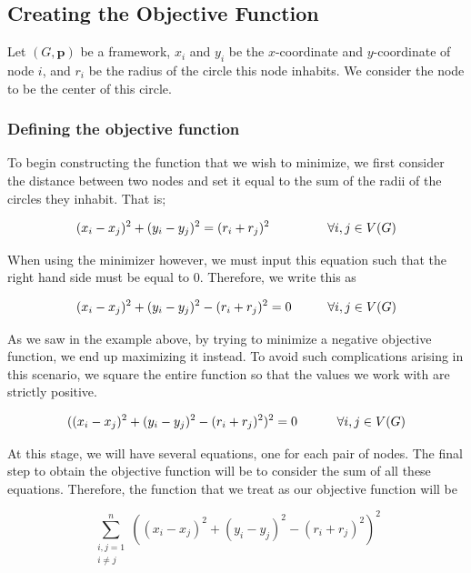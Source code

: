 \subsection{Creating the Objective Function}

\begin{flushleft}
Let $(G, \mathbf{p})$ be a framework, $x_i$ and $y_i$ be the $x$-coordinate and $y$-coordinate of node $i$, and $r_i$ be the radius of the circle this node inhabits. We consider the node to be the center of this circle.
\end{flushleft}

\subsubsection{Defining the objective function}

\begin{flushleft}
To begin constructing the function that we wish to minimize, we first consider the distance between two nodes and set it equal to the sum of the radii of the circles they inhabit. That is;

\begin{equation*}
    (x_i - x_j)^2 + (y_i-y_j)^2 = (r_i + r_j)^2 \hspace{16mm} \forall i,j \in V(G)    
\end{equation*}

\vspace{2mm}
When using the minimizer however, we must input this equation such that the right hand side must be equal to 0. Therefore, we write this as 

\begin{equation*}
    (x_i - x_j)^2 + (y_i-y_j)^2 - (r_i + r_j)^2 = 0 \hspace{10mm} \forall i,j \in V(G)
\end{equation*}

\vspace{2mm}
As we saw in the example above, by trying to minimize a negative objective function, we end up maximizing it instead. To avoid such complications arising in this scenario, we square the entire function so that the values we work with are strictly positive.

\begin{equation*}
    ((x_i - x_j)^2 + (y_i-y_j)^2 - (r_i + r_j)^2)^2 = 0 \hspace{11mm} \forall i,j \in V(G)
\end{equation*}

\vspace{2mm}
At this stage, we will have several equations, one for each pair of nodes. The final step to obtain the objective function will be to consider the sum of all these equations. Therefore, the function that we treat as our objective function will be 

\begin{equation}\label{eq:circle_constraint}
    \sum_{\substack{i,j=1 \\ i \neq j}}^{n} \left( (x_i - x_j)^2 + (y_i - y_j)^2 - (r_i + r_j)^2 \right)^2
  \end{equation}
\end{flushleft}

